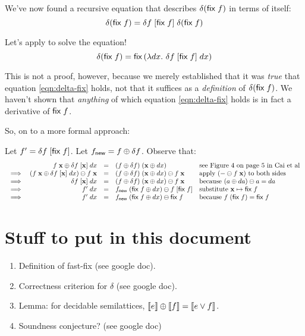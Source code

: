 \documentclass{article}
\begin{document}
We've now found a recursive equation that describes
$\delta(\mathsf{fix}\;f)$ in terms of itself:
\begin{equation}\label{eqn:delta-fix}
  \delta(\mathsf{fix}\;f) = \delta f \;[{\mathsf{fix}\; f}] \; \delta(\mathsf{fix}\;f)
\end{equation}

Let's apply  to solve the equation!
\begin{equation}
  \delta(\mathsf{fix}\; f)
  = \mathsf{fix}\,(\lambda dx.\,\, \delta f \;[{\mathsf{fix}\;f}] \;dx)
\end{equation}

This is not a proof, however, because we merely established that it was
\emph{true} that equation \ref{eqn:delta-fix} holds, not that it suffices as a
\emph{definition} of $\delta(\mathsf{fix}\;f)$. We haven't shown that
\emph{anything} of which equation \ref{eqn:delta-fix} holds is in fact a
derivative of $\mathsf{fix}\;f$. 

So, on to a more formal approach:

Let $f' = \delta{f} \;[{\mathsf{fix}\; f}]$.
Let $f_{\mathsf{new}} = f \oplus \delta f$.
Observe that:
\[\begin{array}{rrcll}
  &   f\;\mathbf{x} \oplus \delta f \;[{\mathbf{x}}] \;dx
  &=& (f \oplus \delta f) \; (\mathbf{x} \oplus dx)
  & \text{see Figure 4 on page 5 in Cai et al}
  \\ \implies&
  (f\;\mathbf{x} \oplus \delta f \; [{\mathbf{x}}] \; dx) \ominus f\;\mathbf{x}
  &=&
  (f \oplus \delta f) \; (\mathbf{x} \oplus dx) \ominus f\;\mathbf{x}
  & \text{apply $(- \ominus f\;\mathbf{x})$ to both sides}
  \\ \implies&
  \delta f \; [{\mathbf{x}}] \; dx
  &=&
  (f \oplus \delta f) \; (\mathbf{x} \oplus dx) \ominus f\;\mathbf{x}
  & \text{because}~(a \oplus da) \ominus a = da
  \\ \implies&
  f' \; dx
  &=& f_{\mathsf{new}} \; (\mathsf{fix}\;f \oplus dx)
      \ominus f\; [{\mathsf{fix}\; f}]
  & \text{substitute $\mathbf{x} \mapsto \mathsf{fix}\;f$}
  \\ \implies&
  f' \; dx
  &=& f_{\mathsf{new}} \; (\mathsf{fix}\;f \oplus dx)
      \ominus \mathsf{fix}\; f
  & \text{because}~f\;(\mathsf{fix}\;f) = \mathsf{fix}\;f
\end{array}\]


\section{Stuff to put in this document}

\begin{enumerate}
\item Definition of \textsf{fast-fix} (see google doc).
\item Correctness criterion for $\delta$ (see google doc).
\item Lemma: for decidable semilattices, $\llbracket{e}\rrbracket \oplus \llbracket{f}\rrbracket = \llbracket{e \vee
  f}\rrbracket$.
\item Soundness conjecture? (see google doc)
\end{enumerate}
\end{document}
